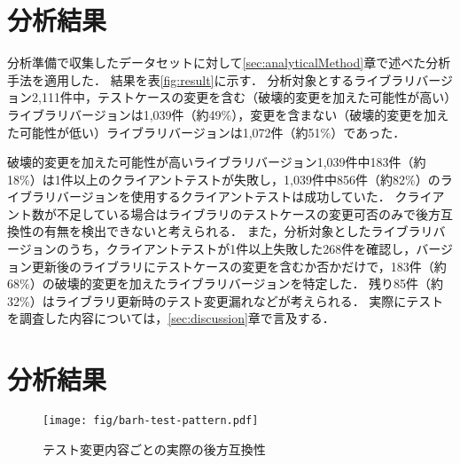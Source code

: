 \documentclass[submit]{ipsj}
\begin{document}
\section{分析結果}
\label{sec:result}

分析準備で収集したデータセットに対して\ref{sec:analyticalMethod}章で述べた分析手法を適用した．
結果を表\ref{fig:result}に示す．
分析対象とするライブラリバージョン2,111件中，テストケースの変更を含む（破壊的変更を加えた可能性が高い）ライブラリバージョンは1,039件（約49\%），変更を含まない（破壊的変更を加えた可能性が低い）ライブラリバージョンは1,072件（約51\%）であった．

破壊的変更を加えた可能性が高いライブラリバージョン1,039件中183件（約18\%）は1件以上のクライアントテストが失敗し，1,039件中856件（約82\%）のライブラリバージョンを使用するクライアントテストは成功していた．
クライアント数が不足している場合はライブラリのテストケースの変更可否のみで後方互換性の有無を検出できないと考えられる．
また，分析対象としたライブラリバージョンのうち，クライアントテストが1件以上失敗した268件を確認し，バージョン更新後のライブラリにテストケースの変更を含むか否かだけで，183件（約68\%）の破壊的変更を加えたライブラリバージョンを特定した．
残り85件（約32\%）はライブラリ更新時のテスト変更漏れなどが考えられる．
実際にテストを調査した内容については，\ref{sec:discussion}章で言及する．

\begin{table}[h]
  \centering
  \caption{分析結果}
  \label{fig:result}
\end{table}


\section{分析結果}\label{seq:rq1-result}

\begin{figure}[t]
  \centering
  \texttt{[image: fig/barh-test-pattern.pdf]}
  \caption{テスト変更内容ごとの実際の後方互換性}
  \label{fig:test_pattern}
\end{figure}
\end{document}
